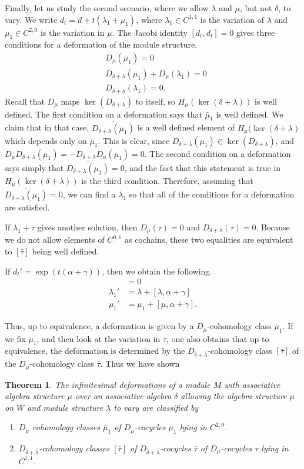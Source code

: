 \documentclass[12pt]{amsart}
\newtheorem{thm}{Theorem}[section]
\theoremstyle{definition}
\begin{document}
Finally, let us study the second scenario, where we allow $\lambda$ and $\mu$,
but not $\delta$, to vary.  We write $d_t=d+t(\lambda_1+\mu_1)$, where
$\lambda_1\in C^{1,1}$ is the variation of $\lambda$ and $\mu_1\in C^{2,0}$ is
the variation in $\mu$.  The Jacobi identity $[d_t,d_t]=0$ gives three conditions
for a deformation of the module structure.
\begin{align*}
&D_\mu(\mu_1)=0\\
&D_{\delta+\lambda}(\mu_1)+D_\mu(\lambda_1)=0\\
&D_{\delta+\lambda}(\lambda_1)=0.
\end{align*}
Recall that $D_\mu$ maps $\ker(D_{\delta+\lambda})$ to itself, so
$H_\mu(\ker(\delta+\lambda))$ is well defined. The first condition on a deformation
says that $\bar\mu_1$ is well defined.  We claim that in that case,
$\overline{D_{\delta+\lambda}(\mu_1)}$ is
a well defined element of $H_\mu(\ker(\delta+\lambda)$ which depends only on $\bar\mu_1$.
This is clear, since $D_{\delta+\lambda}(\mu_1)\in\ker(D_{\delta+\lambda})$,
and  $D_\mu D_{\delta+\lambda}(\mu_1)=-
D_{\delta+\lambda}D_u(\mu_1)=0$. The second condition on a deformation says simply that
$\overline{D_{\delta+\lambda}(\mu_1)}=0$, and the fact that this statement is true
in $H_\mu(\ker(\delta+\lambda))$ is the third condition.  Therefore, assuming that
$\overline{D_{\delta+\lambda}(\mu_1)}=0$, we can find a $\lambda_1$ so that all
of the conditions for a deformation are satisfied.

If $\lambda_1+\tau$ gives another solution, then $D_\mu(\tau)=0$
and $D_{\delta+\lambda}(\tau)=0$.
Because we do not allow elements of $C^{0,1}$ as cochains, these two equalities are
equivalent to  $[\bar\tau]$ being well defined.

If $d_t'=\exp(t(\alpha+\gamma))$, then we obtain the following.
\begin{align*}
[\delta,\alpha+\gamma]&=0\\
\lambda_1'&=\lambda+[\lambda,\alpha+\gamma]\\
\mu_1'&=\mu_1+[\mu,\alpha+\gamma].
\end{align*}

Thus, up to equivalence, a deformation is given by a
$D_\mu$-cohomology class $\bar\mu_1$. If we fix $\mu_1$, and then
look at the variation in $\tau$, one also obtains that up to
equivalence, the deformation is determined by the
$D_{\bar\delta+\bar\lambda}$-cohomology class $[\bar\tau]$ of the $D_\mu$-cohomology
class $\bar\tau$. Thus we have shown
\begin{thm}\label{th10}
The infinitesimal deformations of a module $M$ with associative
algebra structure $\mu$ over an associative algebra $\delta$
allowing the algebra structure $\mu$ on $W$ and module structure
$\lambda$ to vary are classified by
\begin{enumerate}
\item $D_\mu$ cohomology classes $\bar\mu_1$ of $D_\mu$-cocycles $\mu_1$ lying in
$C^{2,0}$.
\item $D_{\bar\delta+\bar\lambda}$-cohomology classes $[\bar\tau]$ of $D_{\bar\delta+\bar\lambda}$-cocycles $\bar\tau$ of $D_\mu$-cocycles
$\tau$ lying in $C^{1,1}$.
\end{enumerate}
\end{thm}
\end{document}
